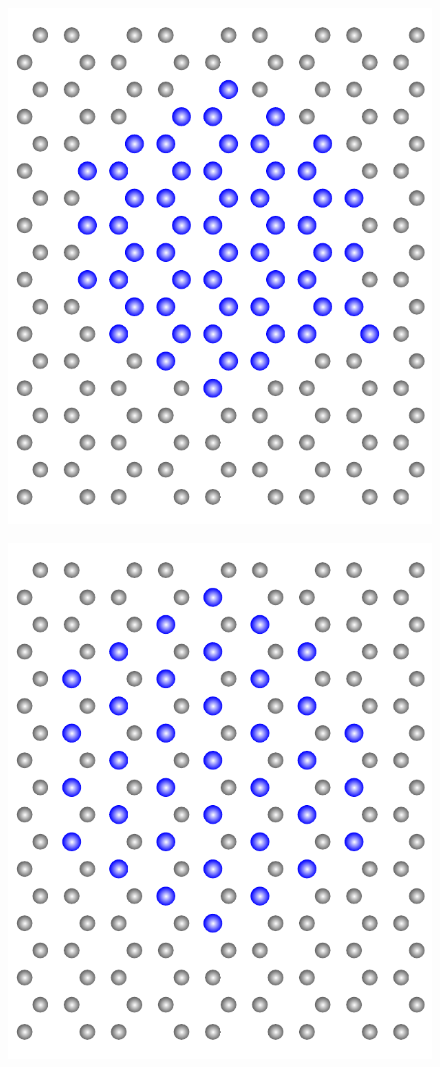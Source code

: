 \documentclass[a4paper, 10pt, twoside, openany]{book} %
\begin{document}
	\begin{figure}
		\begin{minipage}[b]{0.24\textwidth}
			\includegraphics[width=\textwidth]{Abbildungen/C2X2.pdf}
			\label{C2X2-Insel}
		\end{minipage}
		\hfill
		\begin{minipage}[b]{0.24\textwidth}
			\includegraphics[width=\textwidth]{Abbildungen/C2X.pdf}

\end{minipage}
\end{figure}
\end{document}
